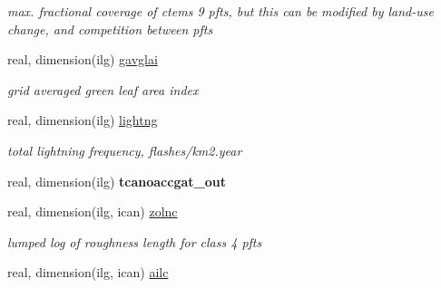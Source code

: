 \begin{DoxyCompactItemize}
\begin{DoxyCompactList}\small\item\em max. fractional coverage of ctem\textquotesingle{}s 9 pfts, but this can be modified by land-\/use change, and competition between pfts \end{DoxyCompactList}\item 
\hypertarget{structctem__statevars_1_1veg__gat_ae10f4def19446ba0e5a0f4cecd6b04bb}{}real, dimension(ilg) \hyperlink{structctem__statevars_1_1veg__gat_ae10f4def19446ba0e5a0f4cecd6b04bb}{gavglai}\label{structctem__statevars_1_1veg__gat_ae10f4def19446ba0e5a0f4cecd6b04bb}

\begin{DoxyCompactList}\small\item\em grid averaged green leaf area index \end{DoxyCompactList}\item 
\hypertarget{structctem__statevars_1_1veg__gat_a8167c3299331c7ed1c7c271efe510e94}{}real, dimension(ilg) \hyperlink{structctem__statevars_1_1veg__gat_a8167c3299331c7ed1c7c271efe510e94}{lightng}\label{structctem__statevars_1_1veg__gat_a8167c3299331c7ed1c7c271efe510e94}

\begin{DoxyCompactList}\small\item\em total lightning frequency, flashes/km2.\+year \end{DoxyCompactList}\item 
\hypertarget{structctem__statevars_1_1veg__gat_a11dd4d1afebf1aedd8228302d4b9ab1b}{}real, dimension(ilg) {\bfseries tcanoaccgat\+\_\+out}\label{structctem__statevars_1_1veg__gat_a11dd4d1afebf1aedd8228302d4b9ab1b}

\item 
\hypertarget{structctem__statevars_1_1veg__gat_aaea690a828dbc658917f50ca48f49794}{}real, dimension(ilg, ican) \hyperlink{structctem__statevars_1_1veg__gat_aaea690a828dbc658917f50ca48f49794}{zolnc}\label{structctem__statevars_1_1veg__gat_aaea690a828dbc658917f50ca48f49794}

\begin{DoxyCompactList}\small\item\em lumped log of roughness length for class\textquotesingle{} 4 pfts \end{DoxyCompactList}\item 
\hypertarget{structctem__statevars_1_1veg__gat_a500b0e7dd54fbe4ceafb02cf2a955539}{}real, dimension(ilg, ican) \hyperlink{structctem__statevars_1_1veg__gat_a500b0e7dd54fbe4ceafb02cf2a955539}{ailc}\label{structctem__statevars_1_1veg__gat_a500b0e7dd54fbe4ceafb02cf2a955539}


\end{DoxyCompactItemize}
